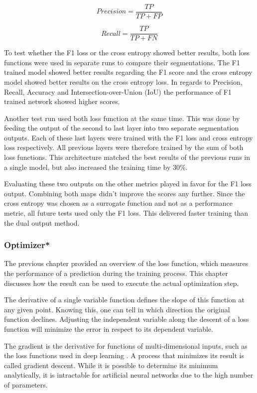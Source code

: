\begin{equation}
Precision = \frac{TP}{TP+FP}
\end{equation}

\begin{equation}
Recall = \frac{TP}{TP+FN}
\end{equation}

To test whether the F1 loss or the cross entropy showed better results, both loss functions were used in separate runs to compare their segmentations. The F1 trained model showed better results regarding the F1 score and the cross entropy model showed better results on the cross entropy loss. In regards to Precision, Recall, Accuracy and Intersection-over-Union (IoU) the performance of F1 trained network showed higher scores.

Another test run used both loss function at the same time. This was done by feeding the output of the second to last layer into two separate segmentation outputs. Each of these last layers were trained with the F1 loss and cross entropy loss respectively. All previous layers were therefore trained by the sum of both loss functions. This architecture matched the best results of the previous runs in a single model, but also increased the training time by 30\%.

Evaluating these two outputs on the other metrics played in favor for the F1 loss output. Combining both maps didn't improve the scores any further. Since the cross entropy was chosen as a surrogate function and not as a performance metric, all future tests used only the F1 loss. This delivered faster training than the dual output method.

\subsubsection{Optimizer*}

The previous chapter provided an overview of the loss function, which measures the performance of a prediction during the training process. This chapter discusses how the result can be used to execute the actual optimization step.

The derivative of a single variable function defines the slope of this function at any given point. Knowing this, one can tell in which direction the original function declines. Adjusting the independent variable along the descent of a loss function will minimize the error in respect to its dependent variable.

The gradient is the derivative for functions of multi-dimensional inputs, such as the loss functions used in deep learning \cite{Chollet2017}. A process that minimizes its result is called gradient descent. While it is possible to determine its minimum analytically, it is intractable for artificial neural networks due to the high number of parameters.

